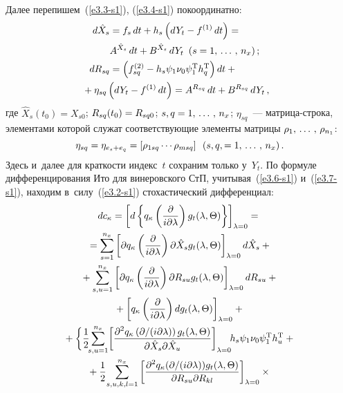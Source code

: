 \begin{multicols}{2}
Далее перепишем~(\ref{e3.3-s1}), (\ref{e3.4-s1}) покоординатно:
\begin{align}
d\hat X_s &= f_s \,dt + h_s \left(dY_t- f^{(1)}\, dt\right) = {}\notag\\
&
A^{\hat X_s}\, dt + B^{\hat X_s}\, dY_t\enskip (s=1\tr
    n_x)\,;\label{e3.6-s1}\\
 dR_{sq} &=\left(f_{sq}^{(2)} - h_s\psi_1\nu_0\psi_1^{\mathrm{T}}
    h_q^{\mathrm{T}} \right) dt +{}\notag\\
    &\hspace*{-10mm}{}+\eta_{sq} 
    \left(dY_t - f^{(1)}\, dt\right)=A^{R_{sq}}\, dt + B^{R_{sq}}\, dY_t\,,
    \label{e3.7-s1}
    \end{align}
где $\hat X_s (t_0) = X_{s0}$; $R_{sq} (t_0)\hm = R_{sq0}$;  
$s,q\hm=1\tr n_x$; $\eta_{sq}$~--- мат\-ри\-ца-стро\-ка, 
элементами которой служат
соответствующие элементы матрицы  $\rho_1,\,\ldots\,,\, \rho_{n_1}$:
\begin{equation*}
\eta_{sq} =\eta_{e_s+e_q} = \left[ \rho_{1sq}\cdots \rho_{msq}\right]
    \enskip (s,q,=1,\,\ldots\,,\, n_x)\,.
    \end{equation*}
Здесь и~далее для краткости индекс~$t$ сохраним только у~$Y_t$. 
По формуле дифференцирования Ито для винеровского СтП, учитывая~(\ref{e3.6-s1}) 
и~(\ref{e3.7-s1}), находим в~силу~(\ref{e3.2-s1}) стохастический дифференциал:
\begin{multline*}
dc_\kappa =\lk d\lf  q_\kappa \left(\fr{\partial}{i\partial \la}\right) g_t
    (\la,\Theta)\rf\rk_{\la=0}={}\\
{}=\sss_{s=1}^{n_x} \lk\partial q_\kappa
    \left(\fr{\partial }{i\partial \la}\right) \partial \hat X_s g_t
    (\la,\Theta)\rk_{\la=0}d \hat X_s+{}\\
{}+\sss_{s,u=1}^{n_x} \lk\partial
    q_\kappa \left(\fr{\partial}{i\partial \la}\right) \partial R_{su} g_t
    (\la,\Theta)\rk_{\la=0}dR_{su} +{}\\
    {}+ \lk q_\kappa \left(
    \fr{\partial }{i\partial \la}\right) d g_t (\la,\Theta)\rk_{\la=0}+{}\\
{}+ \biggl\{ \fr{1}{2}\!\! \sss_{s,u=1}^{n_x}\! \lk \fr{\partial^2 q_\kappa
    \left({\partial}/(i\partial \la)\right)
    g_t (\la,\Theta)}{\partial \hat X_s
    \partial \hat X_u }\rk_{\la=0}\!\! h_s \psi_1\nu_0\psi_1^{\mathrm{T}} h_u^{\mathrm{T}} +{}\\
    {}+
    \fr{1}{2}\! \sss_{s,u,k,l=1}^{n_x} \left[ \fr{\partial^2 q_\kappa (\partial
    /(i\partial \la))
    g_t (\la,\Theta)}{\partial R_{su} \partial R_{kl}}
    \right]_{\la=0} \times{}\\

\end{multline*}
\end{multicols}
